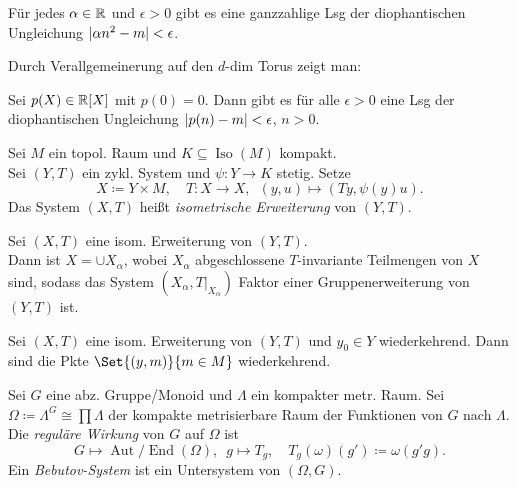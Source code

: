 \documentclass{cheat-sheet}
\DeclareMathOperator{\Aut}{Aut} %
\DeclareMathOperator{\End}{End} %
\newcommand{\AutEnd}{\Aut\!/\!\End} %
\DeclareMathOperator{\Iso}{Iso} %
\begin{document}
\begin{prop}
  Für jedes $\alpha \in \mathbb{R}$ und $\epsilon > 0$ gibt es eine ganzzahlige Lsg der diophantischen Ungleichung
  $\lvert\alpha n^2 - m\rvert < \epsilon$.
\end{prop}

\begin{bem}
  Durch Verallgemeinerung auf den $d$-dim Torus zeigt man:
\end{bem}

\begin{prop}
  Sei $p(X) \in \mathbb{R}[X]$ mit $p(0) = 0$. Dann gibt es für alle $\epsilon > 0$ eine Lsg der diophantischen Ungleichung
  $\lvert p(n) - m\rvert < \epsilon$, $n > 0$.
\end{prop}

\begin{defn}
  Sei $M$ ein topol. Raum und $K \subseteq \Iso(M)$ kompakt. \\
  Sei $(Y, T)$ ein zykl. System und $\psi : Y \to K$ stetig. Setze
  \[
    X \coloneqq Y \!\times\! M, \quad
    T : X \to X, \enspace (y, u) \mapsto (Ty, \psi(y)u).
  \]
  Das System $(X, T)$ heißt \emph{isometrische Erweiterung} von $(Y, T)$.
\end{defn}

\begin{prop}
  Sei $(X, T)$ eine isom. Erweiterung von $(Y, T)$. \\
  Dann ist $X = \cup X_\alpha$, wobei $X_\alpha$ abgeschlossene $T$-invariante Teilmengen von $X$ sind, sodass das System $(X_\alpha, T|_{X_\alpha})$ Faktor einer Gruppenerweiterung von $(Y, T)$ ist.
\end{prop}

\begin{prop}
  Sei $(X, T)$ eine isom. Erweiterung von $(Y, T)$ und $y_0 \in Y$ wiederkehrend.
  Dann sind die Pkte $\Set{(y, m)}{m \in M}$ wiederkehrend.
\end{prop}


\begin{defn}
  Sei $G$ eine abz. Gruppe/Monoid und $\Lambda$ ein kompakter metr. Raum.
  Sei $\Omega \coloneqq \Lambda^G \cong \prod \Lambda$ der kompakte metrisierbare Raum der Funktionen von $G$ nach $\Lambda$. Die \emph{reguläre Wirkung} von $G$ auf $\Omega$ ist
  \[
    G \mapsto \AutEnd(\Omega), \enspace g \mapsto T_g, \quad
    T_g(\omega)(g') \coloneqq \omega(g'g).
  \]
  Ein \emph{Bebutov-System} ist ein Untersystem von $(\Omega, G)$.
\end{defn}
\end{document}
